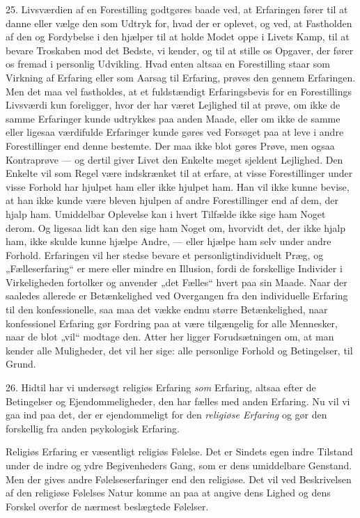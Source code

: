 \documentclass[12pt,a4paper,openany]{book}
\newcommand{\opage}[1]{\marginnote{\footnotesize\textit{[#1]}}}
\begin{document}
25. Livsværdien af en Forestilling godtgøres baade ved, at Erfaringen
fører til at danne eller vælge den som Udtryk for, hvad der er oplevet,
og ved, at Fastholden af den og Fordybelse i den hjælper til at holde
Modet oppe i Livets Kamp, til at bevare Troskaben mod det Bedste, vi
kender, og til at stille os Opgaver, der fører os fremad i personlig
Udvikling. Hvad enten altsaa en Forestilling staar som Virkning af
Erfaring eller som Aarsag til Erfaring, prøves den gennem Erfaringen.
Men det maa vel fastholdes, at et fuldstændigt Erfaringsbevis for en
Forestillings Livsværdi kun foreligger, hvor der har været Lejlighed til
at prøve, om ikke de samme Erfaringer kunde udtrykkes paa anden Maade,
eller om ikke de samme eller ligesaa værdifulde Erfaringer kunde gøres
ved Forsøget paa at leve i andre Forestillinger end denne bestemte. Der
maa ikke blot gøres Prøve, men ogsaa Kontraprøve --- og dertil giver
Livet den Enkelte meget sjeldent Lejlighed. Den Enkelte vil som Regel
være indskrænket til at erfare, at visse Forestillinger under visse
Forhold har hjulpet ham eller ikke hjulpet ham. Han vil ikke kunne
bevise, at han ikke kunde være bleven hjulpen af andre Forestillinger
end af dem, der hjalp ham. Umiddelbar Oplevelse kan i hvert Tilfælde
ikke sige ham Noget derom. Og ligesaa lidt kan den sige ham Noget om,
hvorvidt det, der ikke hjalp ham, ikke skulde kunne hjælpe Andre, ---
eller hjælpe ham selv under andre Forhold. Erfaringen vil her stedse
bevare et personligtindividuelt Præg, og „Fælleserfaring“ er mere eller
mindre en Illusion, fordi de forskellige Individer i Virkeligheden
fortolker og anvender „det Fælles“ hvert paa sin Maade. Naar der
saaledes allerede er Betænkelighed ved Overgangen fra den individuelle
Erfaring til den konfessionelle, saa maa det vække endnu større
Betænkelighed, naar konfessionel Erfaring gør Fordring paa at være
tilgængelig for alle Mennesker, naar de blot „vil“ modtage den. Atter
her ligger Forudsætningen om, at man kender alle Muligheder, det vil her
sige: alle personlige Forhold og Betingelser, til Grund.

26. Hidtil har vi undersøgt religiøs Erfaring \textit{som} Erfaring,
altsaa efter de Betingelser og Ejendommeligheder, den har fælles
\opage{62}med anden Erfaring. Nu vil vi gaa ind paa det, der er
ejendommeligt for den \textit{religiøse Erfaring} og gør den forskellig
fra anden psykologisk Erfaring.

Religiøs Erfaring er væsentligt religiøs Følelse. Det er Sindets egen
indre Tilstand under de indre og ydre Begivenheders Gang, som er dens
umiddelbare Genstand. Men der gives andre Følelseserfaringer end den
religiøse. Det vil ved Beskrivelsen af den religiøse Følelses Natur
komme an paa at angive dens Lighed og dens Forskel overfor de nærmest
beslægtede Følelser.
\end{document}
